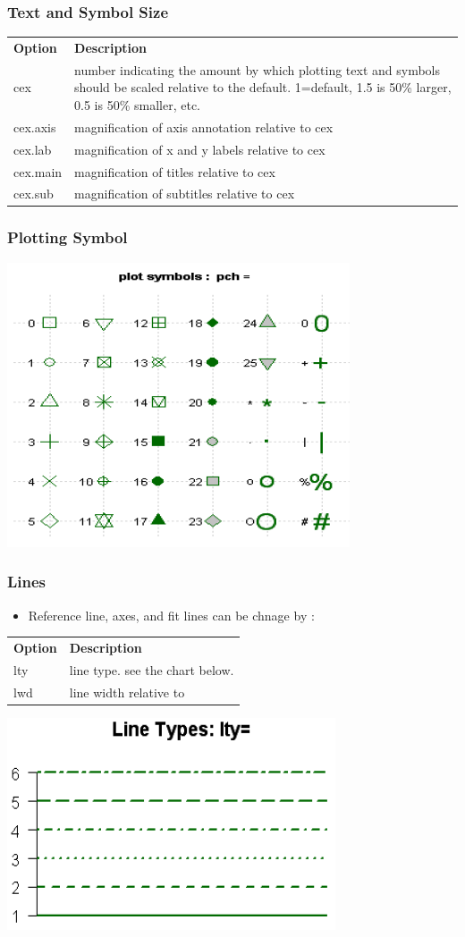 \documentclass[12pt]{beamer}
\begin{document}
\begin{frame}
\frametitle{Text and Symbol Size}
\begin{tabular}{lp{}}
	\textbf{Option} &\textbf{Description}\\
	cex &number indicating the amount by which plotting text and
	symbols should be scaled relative to the default.
	1=default, 1.5 is 50\% larger, 0.5 is 50\% smaller, etc.\\
	cex.axis &magnification of axis annotation relative to cex\\
	cex.lab &magnification of x and y labels relative to cex\\
	cex.main &magnification of titles relative to cex\\
	cex.sub &magnification of subtitles relative to cex\\
\end{tabular}
\end{frame}

\begin{frame}
\frametitle{Plotting Symbol}
\includegraphics[scale=0.5]{pch}
\end{frame}

\begin{frame}
\frametitle{Lines}
\begin{itemize}
	\item Reference line, axes, and fit lines can be chnage by :
\end{itemize}
\begin{tabular}{lp{}}
	\textbf{Option} &\textbf{Description}\\
lty &line type. see the chart below.\\
lwd &line width relative to\\	
\end{tabular}
\includegraphics[scale=0.5]{line}
\end{frame}
\end{document}
